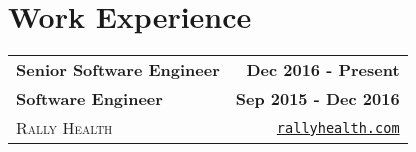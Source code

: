\documentclass[letterpaper]{article}
\newenvironment{details}
{\begin{itemize}}
{\end{itemize}}
\begin{document}
%
%
%
%


  \section{Work Experience}

  \noindent
  \begin{tabularx}{\textwidth}{@{}X r@{}}
    \textbf{Senior Software Engineer} & \textbf{Dec 2016 - Present} \\
    \textbf{Software Engineer} & \textbf{Sep 2015 - Dec 2016} \\
    \textsc{Rally Health} & \texttt{\href{http://rallyhealth.com}{rallyhealth.com}}
  \end{tabularx}
\end{document}
